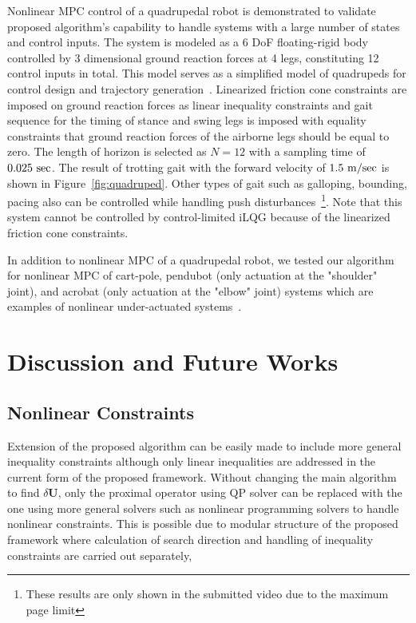 Nonlinear MPC control of a quadrupedal robot is demonstrated to validate proposed algorithm's capability to handle systems with a large number of states and control inputs. The system is modeled as a 6 DoF floating-rigid body controlled by 3 dimensional ground reaction forces at 4 legs, constituting 12 control inputs in total. This model serves as a simplified model of quadrupeds for control design and trajectory generation~\cite{8594448,8283570}. Linearized friction cone constraints are imposed on ground reaction forces as linear inequality constraints and gait sequence for the timing of stance and swing legs is imposed with equality constraints that ground reaction forces of the airborne legs should be equal to zero. The length of horizon is selected as $N=12$ with a sampling time of $0.025~\rm{sec}$. The result of trotting gait with the forward velocity of $1.5~\rm{m/sec}$ is shown in Figure~\ref{fig:quadruped}. Other types of gait such as galloping, bounding, pacing also can be controlled while handling push disturbances~\footnote{\label{note1}These results are only shown in the submitted video due to the maximum page limit}. Note that this system cannot be controlled by control-limited iLQG because of the linearized friction cone constraints.

In addition to nonlinear MPC of a quadrupedal robot, we tested our algorithm for nonlinear MPC of cart-pole, pendubot (only actuation at the "shoulder" joint), and acrobat (only actuation at the "elbow" joint) systems which are examples of nonlinear under-actuated systems~. 


\section{Discussion and Future Works}
\subsection{Nonlinear Constraints}
Extension of the proposed algorithm can be easily made to include more general inequality constraints although only linear inequalities are addressed in the current form of the proposed framework. Without changing the main algorithm to find $\delta \mathbf{U}$, only the proximal operator using QP solver can be replaced with the one using more general solvers such as nonlinear programming solvers to handle nonlinear constraints. This is possible due to modular structure of the proposed framework where calculation of search direction and handling of inequality constraints are carried out separately,     


